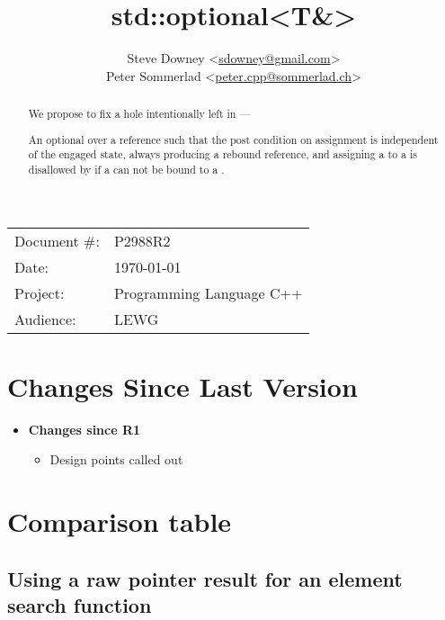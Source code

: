 \documentclass[a4paper,10pt,oneside,openany,final,article]{memoir}
\begin{document}
\title{std::optional<T\&>}
\author{
  Steve Downey \small<\href{mailto:sdowney@gmail.com}{sdowney@gmail.com}> \\
  Peter Sommerlad \small<\href{mailto:peter.cpp@sommerlad.ch}{peter.cpp@sommerlad.ch}> \\
}
\date{} %
\maketitle

\begin{flushright}
  \begin{tabular}{ll}
    Document \#: & P2988R2 \\
    Date: & \today \\
    Project: & Programming Language C++ \\
    Audience: & LEWG
  \end{tabular}
\end{flushright}

\begin{abstract}
  We propose to fix a hole intentionally left in  ---

  An optional over a reference such that the post condition on assignment is independent of the engaged state, always producing a rebound reference, and assigning a  to a  is disallowed by  if a  can not be bound to a .
\end{abstract}

\tableofcontents*

\chapter*{Changes Since Last Version}

\begin{itemize}
\item \textbf{Changes since R1}
  \begin{itemize}
  \item Design points called out
  \end{itemize}
\end{itemize}

\chapter{Comparison table}
\section{Using a raw pointer result for an element search function}
\end{document}
